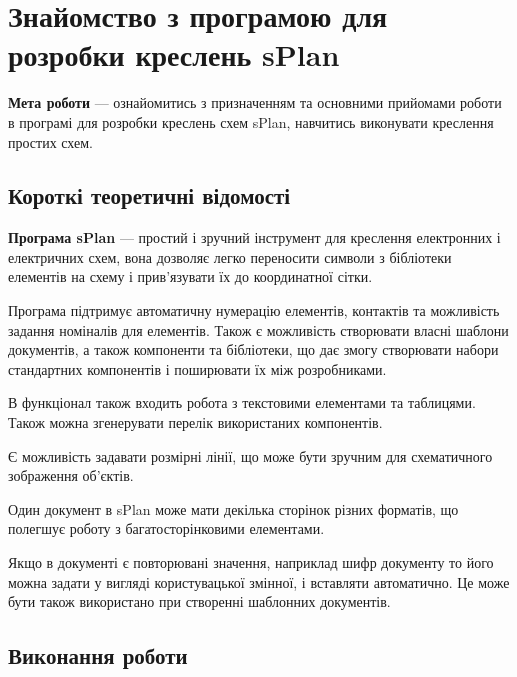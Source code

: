 \newpage\BorderFirstPage
\chapter[~]{Знайомство з програмою для розробки креслень sPlan}
\textbf{Мета роботи} --- ознайомитись з призначенням та основними прийомами роботи в програмі для
розробки креслень схем sPlan, навчитись виконувати креслення простих схем.


\section{Короткі теоретичні відомості}

\textbf{Програма sPlan} --- простий і зручний інструмент для креслення електронних і електричних
схем, вона дозволяє легко переносити символи з бібліотеки елементів на схему і прив'язувати їх до
координатної сітки.

Програма підтримує автоматичну нумерацію елементів, контактів та можливість задання номіналів для
елементів. Також є можливість створювати власні шаблони документів, а також компоненти та
бібліотеки, що дає змогу створювати набори стандартних компонентів і поширювати їх між розробниками.

В функціонал також входить робота з текстовими елементами та таблицями. Також можна згенерувати
перелік використаних компонентів.

Є можливість задавати розмірні лінії, що може бути зручним для схематичного зображення об'єктів.

Один документ в sPlan може мати декілька сторінок різних форматів, що полегшує роботу з
багатосторінковими елементами.

Якщо в документі є повторювані значення, наприклад шифр документу то його можна задати у вигляді
користувацької змінної, і вставляти автоматично. Це може бути також використано при створенні
шаблонних документів.

\newpage
\BorderText
\restoregeometry
\section{Виконання роботи}

